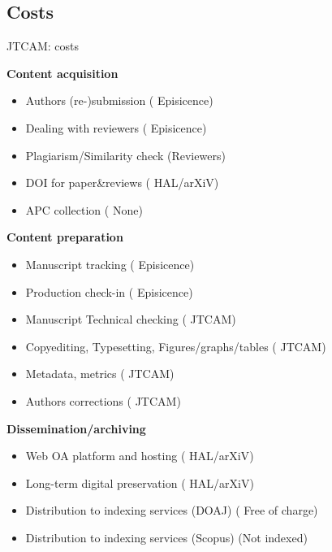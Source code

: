 \documentclass[10pt,compress,serif,aspectratio=169]{beamer}
\begin{document}
\subsection{Costs}
\begin{frame}[t]{JTCAM: costs}

  \begin{minipage}{.45\textwidth}
   \textbf{Content acquisition}
   \begin{itemize}
   \item Authors (re-)submission ({\color{teal} Episicence})
   \item Dealing with reviewers ({\color{teal} Episicence})
   \item Plagiarism/Similarity check (\alert{Reviewers})
   \item DOI for paper\&reviews ({\color{teal} HAL/arXiV})
   \item APC collection ({\color{teal} None})
   \end{itemize}
 \end{minipage}
 \hfill
   \pause
 \begin{minipage}{.45\textwidth}
   \textbf{Content preparation}
   \begin{itemize}
   \item Manuscript tracking  ({\color{teal} Episicence})
   \item Production check-in  ({\color{teal} Episicence})
   \item Manuscript Technical checking ({\color{teal} JTCAM})
   \item Copyediting, Typesetting, Figures/graphs/tables ({\color{teal} JTCAM})
   \item Metadata, metrics ({\color{teal} JTCAM})
   \item Authors corrections ({\color{teal} JTCAM})
   \end{itemize}
\end{minipage}
\vfill
\pause
\begin{center}
 \begin{minipage}{.7\textwidth}
  \textbf{Dissemination/archiving}
  \begin{itemize}
  \item Web OA platform and hosting ({\color{teal} HAL/arXiV})
  \item Long-term digital preservation ({\color{teal} HAL/arXiV})
  \item Distribution to indexing services (DOAJ) ({\color{teal} Free of charge})
  \item Distribution to indexing services (Scopus) (\alert{Not indexed})
  \end{itemize}
\end{minipage}
\end{center}
\end{frame}
\end{document}
